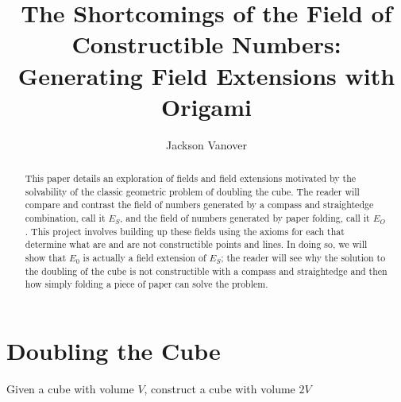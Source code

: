 \documentclass[]{article}
\title{The Shortcomings of the Field of Constructible Numbers: Generating Field Extensions with Origami}
\author{Jackson Vanover}
\begin{document}
\maketitle

\begin{abstract}
This paper details an exploration of fields and field extensions motivated by the solvability of the classic geometric problem of doubling the cube. The reader will compare and contrast the field of numbers generated by a compass and straightedge combination, call it $E_S$, and the field of numbers generated by paper folding, call it $E_O$. This project involves building up these fields using the axioms for each that determine what are and are not constructible points and lines. In doing so, we will show that $E_0$ is actually a field extension of $E_S$; the reader will see why the solution to the doubling of the cube is not constructible with a compass and straightedge and then how simply folding a piece of paper can solve the problem.
\end{abstract}

\section{Doubling the Cube}
Given a cube with volume $V$, construct a cube with volume $2V$
\end{document}
